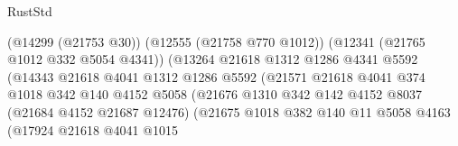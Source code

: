 \begin{lexlean}{RustStd}
\begin{coremodule}
                                                (@14299 (@21753 @30))
                                                (@12555 (@21758 @770 @1012))
                                                (@12341 (@21765 @1012 @332 @5054 @4341))
                                                (@13264
                                                  @21618
                                                  @1312
                                                  @1286
                                                  @4341
                                                  @5592
                                                  (@14343
                                                    @21618
                                                    @4041
                                                    @1312
                                                    @1286
                                                    @5592
                                                    (@21571
                                                      @21618
                                                      @4041
                                                      @374
                                                      @1018
                                                      @342
                                                      @140
                                                      @4152
                                                      @5058
                                                      (@21676
                                                        @1310
                                                        @342
                                                        @142
                                                        @4152
                                                        @8037
                                                        (@21684 @4152 @21687 @12476)
                                                        (@21675
                                                          @1018
                                                          @382
                                                          @140
                                                          @11
                                                          @5058
                                                          @4163
                                                          (@17924
                                                            @21618
                                                            @4041
                                                            @1015

\end{coremodule}
\end{lexlean}
